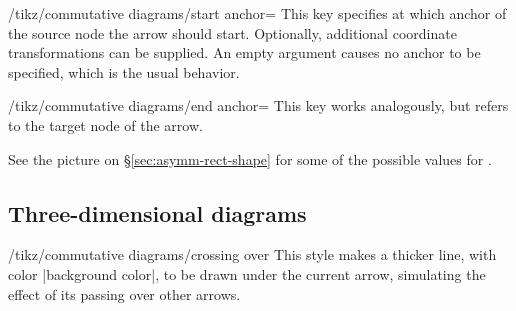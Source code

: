 \documentclass[a4paper]{ltxdoc}
\begin{document}
\begin{codeexample}[]
\end{codeexample}

\begin{key}{/tikz/commutative diagrams/start anchor=}
  This key specifies at which anchor of the source node the arrow
  should start.  Optionally, additional coordinate transformations can
  be supplied.  An empty  argument causes no anchor to be
  specified, which is the usual behavior.
\end{key}

\begin{key}{/tikz/commutative diagrams/end anchor=}
  This key works analogously, but refers to the target node of the arrow.
\end{key}

See the picture on \S\ref{sec:asymm-rect-shape} for some of the
possible values for .
\begin{codeexample}[]
\end{codeexample}

\subsection{Three-dimensional diagrams}
\label{sec:crossing-over}

\begin{stylekey}{/tikz/commutative diagrams/crossing over}
  This style makes a thicker line, with color |background color|, to
  be drawn under the current arrow, simulating the effect of its
  passing over other arrows.

\begin{codeexample}[]
\end{codeexample}
\end{stylekey}
\end{document}
